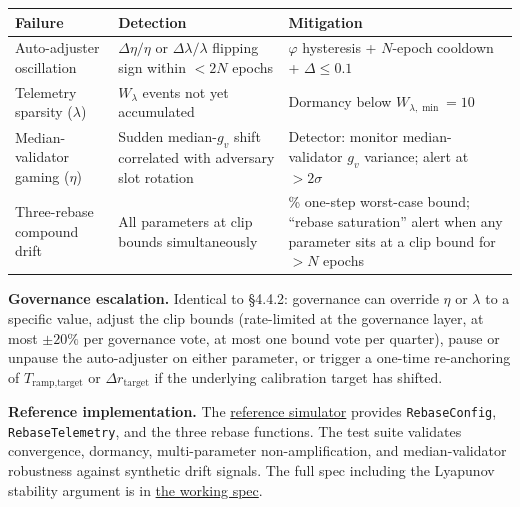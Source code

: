 \documentclass[
  11pt,
]{article}
\newcounter{none} %
\begin{document}
{\def\LTcaptype{none} %
\begin{longtable}[]{@{}
  >{\raggedright\arraybackslash}p{}
  >{\raggedright\arraybackslash}p{}
  >{\raggedright\arraybackslash}p{}@{}}
\toprule\noalign{}
\begin{minipage}[b]{\linewidth}\raggedright
Failure
\end{minipage} & \begin{minipage}[b]{\linewidth}\raggedright
Detection
\end{minipage} & \begin{minipage}[b]{\linewidth}\raggedright
Mitigation
\end{minipage} \\
\midrule\noalign{}
\endhead
\bottomrule\noalign{}
\endlastfoot
Auto-adjuster oscillation & \(\Delta\eta / \eta\) or
\(\Delta\lambda / \lambda\) flipping sign within \(< 2N\) epochs &
\(\varphi\) hysteresis + \(N\)-epoch cooldown + \(\Delta \leq 0.1\) \\
Telemetry sparsity (\(\lambda\)) & \(W_\lambda\) events not yet
accumulated & Dormancy below \(W_{\lambda,\min} = 10\) \\
Median-validator gaming (\(\eta\)) & Sudden median-\(g_v\) shift
correlated with adversary slot rotation & Detector: monitor
median-validator \(g_v\) variance; alert at \(> 2\sigma\) \\
Three-rebase compound drift & All parameters at clip bounds
simultaneously & 34\% one-step worst-case bound; ``rebase saturation''
alert when any parameter sits at a clip bound for \(> N\) epochs \\
\end{longtable}
}

\textbf{Governance escalation.} Identical to §4.4.2: governance can
override \(\eta\) or \(\lambda\) to a specific value, adjust the clip
bounds (rate-limited at the governance layer, at most \(\pm 20\%\) per
governance vote, at most one bound vote per quarter), pause or unpause
the auto-adjuster on either parameter, or trigger a one-time
re-anchoring of \(T_{\text{ramp,target}}\) or
\(\Delta r_{\text{target}}\) if the underlying calibration target has
shifted.

\textbf{Reference implementation.} The
\href{https://github.com/ligate-io/ligate-research/tree/main/prototypes/poua-sim}{reference
simulator} provides \texttt{RebaseConfig}, \texttt{RebaseTelemetry}, and
the three rebase functions. The test suite validates convergence,
dormancy, multi-parameter non-amplification, and median-validator
robustness against synthetic drift signals. The full spec including the
Lyapunov stability argument is in
\href{https://github.com/ligate-io/ligate-research/blob/main/papers/poua/specs/eta-lambda-rebase.md}{the
working spec}.
\end{document}
